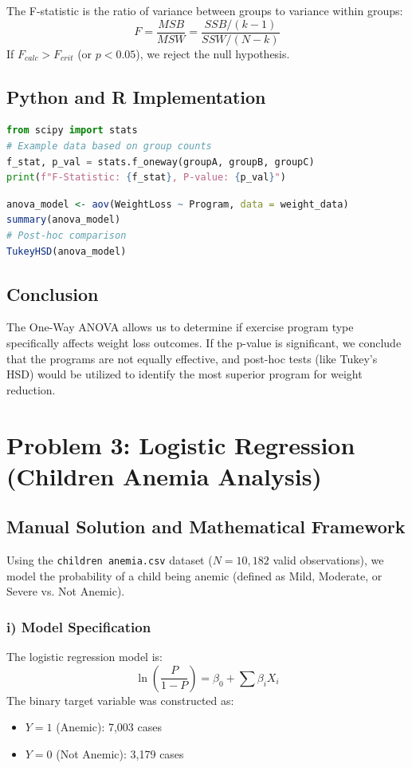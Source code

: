 \documentclass[12pt, a4paper]{article}
\begin{document}
The F-statistic is the ratio of variance between groups to variance within groups:
\[ F = \frac{MSB}{MSW} = \frac{SSB/(k-1)}{SSW/(N-k)} \]
If $F_{calc} > F_{crit}$ (or $p < 0.05$), we reject the null hypothesis.

\subsection{Python and R Implementation}
\begin{lstlisting}[language=Python, caption=Python ANOVA for Problem 2]
from scipy import stats
# Example data based on group counts
f_stat, p_val = stats.f_oneway(groupA, groupB, groupC)
print(f"F-Statistic: {f_stat}, P-value: {p_val}")
\end{lstlisting}

\begin{lstlisting}[language=R, caption=R ANOVA for Problem 2]
anova_model <- aov(WeightLoss ~ Program, data = weight_data)
summary(anova_model)
# Post-hoc comparison
TukeyHSD(anova_model)
\end{lstlisting}

\subsection{Conclusion}
The One-Way ANOVA allows us to determine if exercise program type specifically affects weight loss outcomes. If the p-value is significant, we conclude that the programs are not equally effective, and post-hoc tests (like Tukey's HSD) would be utilized to identify the most superior program for weight reduction.


\newpage
\section{Problem 3: Logistic Regression (Children Anemia Analysis)}
\label{prob3}

\subsection{Manual Solution and Mathematical Framework}
Using the \texttt{children anemia.csv} dataset ($N = 10,182$ valid observations), we model the probability of a child being anemic (defined as Mild, Moderate, or Severe vs. Not Anemic).

\subsubsection{i) Model Specification}
The logistic regression model is:
\[ \ln\left(\frac{P}{1-P}\right) = \beta_0 + \sum \beta_i X_i \]
The binary target variable was constructed as:
\begin{itemize}
    \item $Y=1$ (Anemic): 7,003 cases
    \item $Y=0$ (Not Anemic): 3,179 cases
\end{itemize}
\end{document}
